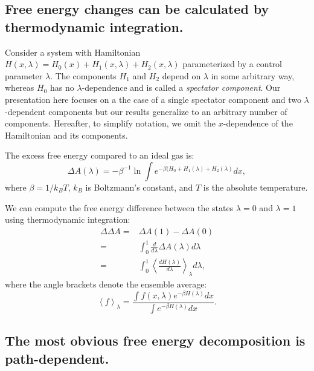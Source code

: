\documentclass{article}
\begin{document}
\subsection{Free energy changes can be calculated by thermodynamic integration.}

Consider a system with Hamiltonian $H(x, \lambda) = H_0(x) + H_1(x, \lambda) + H_2(x, \lambda)$ parameterized by a control parameter $\lambda$. The components $H_1$ and $H_2$ depend on $\lambda$ in some arbitrary way, whereas $H_0$ has no $\lambda$-dependence and is called a \emph{spectator component}. Our presentation here focuses on a the case of a single spectator component and two $\lambda$-dependent components but our results generalize to an arbitrary number of components. Hereafter, to simplify notation, we omit the $x$-dependence of the Hamiltonian and its components.

The excess free energy compared to an ideal gas is:
\begin{equation}\label{eq:dA}
\Delta A(\lambda) = -\beta^{-1} \ln \int e^{-\beta(H_0 + H_1(\lambda) + H_2(\lambda)} dx,
\end{equation}
where $\beta=1/k_BT$, $k_B$ is Boltzmann's constant, and $T$ is the absolute temperature.

We can compute the free energy difference between the states $\lambda=0$ and $\lambda=1$ using thermodynamic integration:
\begin{align}
\Delta\Delta A =& \Delta A(1) - \Delta A(0) \nonumber\\
               =& \int_0^1 \frac{d}{d\lambda} \Delta A(\lambda) d\lambda \nonumber\\
               =& \int_0^1 \left\langle \frac{dH(\lambda)}{d\lambda}\right\rangle_\lambda 
                d\lambda \label{eq:TI},
\end{align}
where the angle brackets denote the ensemble average:
\begin{equation}
\left\langle f \right\rangle_\lambda = \frac
	{\int f(x, \lambda) e^{-\beta H(\lambda)} dx}
    {\int e^{-\beta H(\lambda)} dx}.
\end{equation}




\subsection{The most obvious free energy decomposition is path-dependent.}
\end{document}
